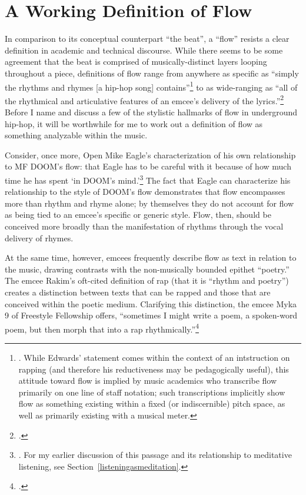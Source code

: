 \onehalfspacing
\section{A Working Definition of Flow}
In comparison to its conceptual counterpart ``the beat'', a ``flow'' resists a clear definition in
academic and technical discourse. While there seems to be some agreement that the beat is comprised
of musically-distinct layers looping throughout a piece, definitions of flow range from anywhere as
specific as ``simply the rhythms and rhymes [a hip-hop song] contains''\footnote{
    \autocite[63]{pauledwardsHowRapArt2009}. While Edwards' statement comes within the context of an
    intstruction on rapping (and therefore his reductiveness may be pedagogically useful), this attitude
    toward flow is implied by music academics who transcribe flow primarily on one line of staff notation;
    such transcriptions implicitly show flow as something existing within a fixed (or indiscernible) pitch
    space, as well as primarily existing with a musical meter.} 
to as wide-ranging as ``all of the rhythmical and articulative features of an emcee's delivery of 
the lyrics.''\footnote{
    \cite{kyleadamsMetricalTechniquesFlow2009}.} 
Before I name and discuss a few of the stylistic hallmarks of flow in underground hip-hop, it will be
worthwhile for me to work out a definition of flow as something analyzable within the music.

Consider, once more, Open Mike Eagle's characterization of his own relationship to MF DOOM's flow:
that Eagle has to be careful with it because of how much time he has spent `in DOOM's mind.'\footnote{
    \cite{estellecaswellRappingDeconstructedBest2016}. For my earlier discussion of this passage and its
    relationship to meditative listening, see Section~\ref{listeningasmeditation}.} 
The fact that Eagle can characterize his relationship to the style of DOOM's flow demonstrates that
flow encompasses more than rhythm and rhyme alone; by themselves they do not account for flow as being
tied to an emcee's specific or generic style. Flow, then, should be conceived more broadly than the
manifestation of rhythms through the vocal delivery of rhymes.

At the same time, however, emcees frequently describe flow as text in relation to the music, drawing
contrasts with the non-musically bounded epithet ``poetry.'' The emcee Rakim's oft-cited definition
of rap (that it is ``rhythm and poetry'') creates a distinction between texts that can be rapped and
those that are conceived within the poetic medium. Clarifying this distinction, the emcee Myka 9 of
Freestyle Fellowship offers, ``sometimes I might write a poem, a spoken-word poem, but then morph
that into a rap rhythmically.''\footnote{
    \autocite[63]{pauledwardsHowRapArt2009}.}

